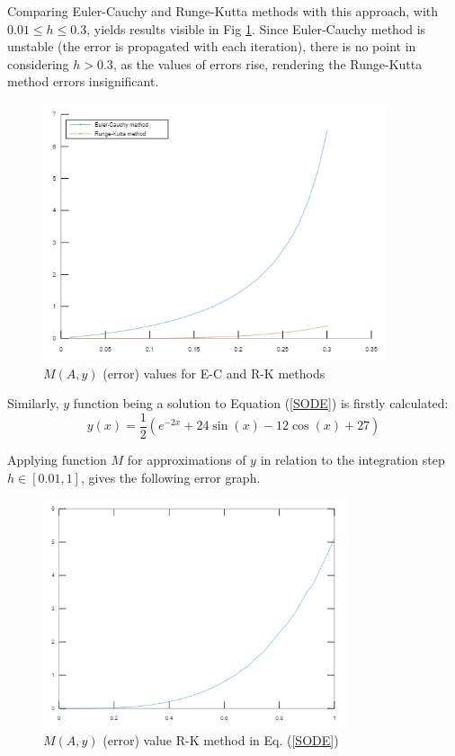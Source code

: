 \documentclass[a4paper,12pt]{article}
\begin{document}
Comparing Euler-Cauchy and Runge-Kutta methods with this approach, with $0.01 \leq h \leq 0.3$, yields results visible in Fig \ref{fig:error_1}. Since Euler-Cauchy method is unstable (the error is propagated with each iteration), there is no point in considering $h > 0.3$, as the values of errors rise, rendering the Runge-Kutta method errors insignificant.

\begin{figure}[H]
    \centering
    \includegraphics[width=0.9\textwidth]{error_1.png}
    \caption{$M(A, y)$ (error) values for E-C and R-K methods}
    \label{fig:error_1}
\end{figure}

Similarly, $y$ function being a solution to Equation (\ref{SODE}) is firstly calculated:
\begin{equation}
    y(x) = \frac{1}{2}\left(e^{-2x} + 24\sin(x) - 12\cos(x) + 27\right)
\end{equation}

Applying function $M$ for approximations of $y$ in relation to the integration step $h \in \left[0.01, 1\right]$, gives the following error graph.

\begin{figure}[H]
    \centering
    \includegraphics[width=0.8\textwidth]{error_2.png}
    \caption{$M(A, y)$ (error) value R-K method in Eq. (\ref{SODE})}
    \label{fig:error_2}
\end{figure}
\end{document}
